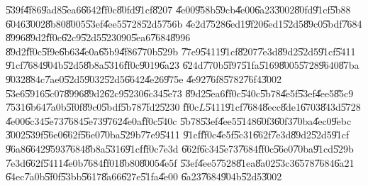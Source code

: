 \U{539f}\U{4f86}\U{9ad8}\U{5ea6}\U{6642}\U{ff0c}\U{80fd}\U{91cf}\U{8207}%
\U{4e00}\U{958b}\U{59cb}\U{4e00}\U{6a23}\U{3002}\U{80fd}\U{91cf}\U{5b88}%
\U{6046}\U{3002}\U{8b80}\U{8005}\U{53ef}\U{4ee5}\U{5728}\U{52d5}\U{756b}%
\U{4e2d}\U{7528}\U{6ed1}\U{9f20}\U{6ed1}\U{52d5}\U{89c0}\U{5bdf}\U{7684}%
\U{8996}\U{89d2}\U{ff0c}\U{62c9}\U{52d5}\U{5230}$90$\U{5ea6}\U{7684}\U{8996}%
\U{89d2}\U{ff0c}\U{5f9e}\U{6b63}\U{4e0a}\U{65b9}\U{4f86}\U{770b}\U{529b}%
\U{77e9}\U{5411}\U{91cf}\U{8207}\U{7e3d}\U{89d2}\U{52d5}\U{91cf}\U{5411}%
\U{91cf}\U{7684}\U{904b}\U{52d5}\U{8b8a}\U{5316}\U{ff0c}\U{9019}\U{6a23}%
\U{624d}\U{770b}\U{5f97}\U{51fa}\U{5169}\U{8005}\U{5728}\U{9640}\U{87ba}%
\U{9032}\U{884c}\U{7ae0}\U{52d5}\U{9032}\U{52d5}\U{6642}\U{4e26}\U{975e}%
\U{4e92}\U{76f8}\U{5782}\U{76f4}\U{3002}\newline
\U{53e6}\U{5916}\U{5c07}\U{8996}\U{89d2}\U{62c9}\U{5230}\U{6c34}\U{5e73}%
\U{89d2}\U{5ea6}\U{ff0c}\U{540c}\U{5b78}\U{4e5f}\U{53ef}\U{4ee5}\U{85c9}%
\U{7531}\U{6b64}\U{7a0b}\U{5f0f}\U{89c0}\U{5bdf}\U{5b78}\U{7fd2}\U{5230}%
\U{ff0c}$L$\U{5411}\U{91cf}\U{7684}\U{8ecc}\U{8de1}\U{6703}\U{843d}\U{5728}%
\U{4e00}\U{6c34}\U{5e73}\U{7684}\U{5e73}\U{9762}\U{4e0a}\U{ff0c}\U{540c}%
\U{5b78}\U{53ef}\U{4ee5}\U{5148}\U{60f3}\U{60f3}\U{70ba}\U{4ec0}\U{9ebc}%
\U{3002}\U{539f}\U{56e0}\U{662f}\U{56e0}\U{70ba}\U{529b}\U{77e9}\U{5411}%
\U{91cf}\U{ff0c}\U{4e5f}\U{5c31}\U{662f}\U{7e3d}\U{89d2}\U{52d5}\U{91cf}%
\U{96a8}\U{6642}\U{9593}\U{7684}\U{8b8a}\U{5316}\U{91cf}\U{ff0c}\U{7e3d}%
\U{662f}\U{6c34}\U{5e73}\U{7684}\U{ff0c}\U{56e0}\U{70ba}\U{91cd}\U{529b}%
\U{7e3d}\U{662f}\U{5411}\U{4e0b}\U{7684}\U{ff01}\U{8b80}\U{8005}\U{4e5f}%
\U{53ef}\U{4ee5}\U{7528}\U{81ea}\U{8a02}\U{53c3}\U{6578}\U{7684}\U{6a21}%
\U{64ec}\U{7a0b}\U{5f0f}\U{53bb}\U{5617}\U{8a66}\U{627e}\U{51fa}\U{4e00}%
\U{6a23}\U{7684}\U{904b}\U{52d5}\U{3002}

